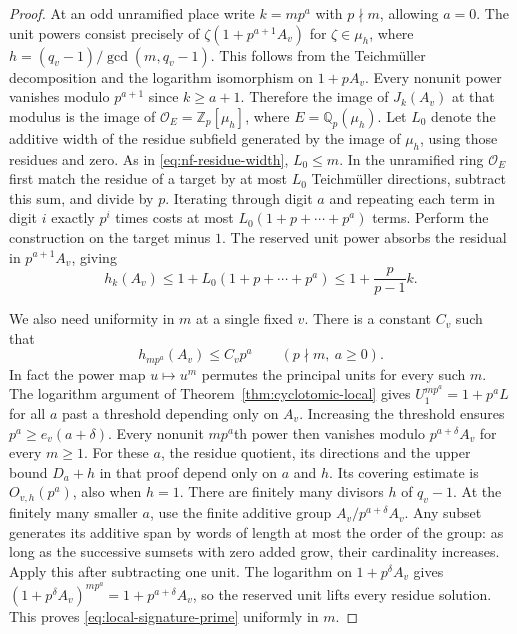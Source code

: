 \documentclass[11pt,letterpaper]{article}
\theoremstyle{definition}
\numberwithin{equation}{section}
\begin{document}
\begin{proof}
At an odd unramified place write $k=mp^a$ with $p\nmid m$,
allowing $a=0$. The unit powers consist precisely of
$\zeta(1+p^{a+1}A_v)$ for $\zeta\in\mu_h$, where
$h=(q_v-1)/\gcd(m,q_v-1)$. This follows from the Teichm\"uller
decomposition and the logarithm isomorphism on $1+pA_v$.
Every nonunit power vanishes modulo $p^{a+1}$ since $k\ge a+1$.
Therefore the image of $J_k(A_v)$ at that modulus is the image of
$\mathcal O_E=\mathbb Z_p[\mu_h]$, where $E=\mathbb Q_p(\mu_h)$.
Let $L_0$ denote the additive width of the residue subfield generated by
the image of $\mu_h$, using those residues and zero. As in
\eqref{eq:nf-residue-width}, $L_0\le m$. In the unramified ring
$\mathcal O_E$ first match the residue of a target by at most $L_0$
Teichm\"uller directions, subtract this sum, and divide by $p$.
Iterating through digit $a$ and repeating each term in digit $i$
exactly $p^i$ times costs at most $L_0(1+p+\cdots+p^a)$ terms.
Perform the construction on the target minus $1$. The reserved unit
power absorbs the residual in $p^{a+1}A_v$, giving
\begin{equation}\label{eq:local-signature-unram}
 h_k(A_v)\le1+L_0(1+p+\cdots+p^a)
             \le1+\frac{p}{p-1}k .
\end{equation}

We also need uniformity in $m$ at a single fixed $v$. There is a
constant $C_v$ such that
\begin{equation}\label{eq:local-signature-prime}
                          h_{mp^a}(A_v)\le C_vp^a
                          \qquad(p\nmid m,\ a\ge0).
\end{equation}
In fact the power map $u\mapsto u^m$ permutes the principal units
for every such $m$. The logarithm argument of
Theorem~\ref{thm:cyclotomic-local} gives
$U_1^{mp^a}=1+p^aL$ for all $a$ past a threshold depending only on
$A_v$. Increasing the threshold ensures $p^a\ge e_v(a+\delta)$.
Every nonunit $mp^a$th power then vanishes modulo $p^{a+\delta}A_v$
for every $m\ge1$. For these $a$, the residue quotient, its directions
and the upper bound $D_a+h$ in that proof depend only on $a$ and
$h$. Its covering estimate is $O_{v,h}(p^a)$, also when $h=1$.
There are finitely many divisors $h$ of $q_v-1$. At the finitely
many smaller $a$, use the finite additive group
$A_v/p^{a+\delta}A_v$. Any subset generates its additive span by
words of length at most the order of the group: as long as the
successive sumsets with zero added grow, their cardinality increases.
Apply this after subtracting one unit. The logarithm on
$1+p^\delta A_v$ gives $(1+p^\delta A_v)^{mp^a}=1+p^{a+\delta}A_v$,
so the reserved unit lifts every residue solution. This proves
\eqref{eq:local-signature-prime} uniformly in $m$.


\end{proof}
\end{document}

